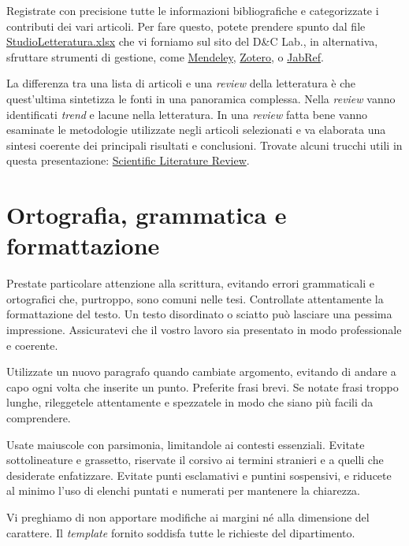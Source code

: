 \documentclass{article}
\newcounter{nota}
\begin{document}
Registrate con precisione tutte le informazioni bibliografiche e categorizzate i contributi dei vari articoli. Per fare questo, potete prendere spunto dal file \href{http://dclab.poliba.it/wp-content/uploads/StudioLetteratura.xlsx}{StudioLetteratura.xlsx} che vi forniamo sul sito del D\&C Lab., in alternativa, sfruttare strumenti di gestione, come \href{https://www.mendeley.com/?interaction_required=true}{Mendeley}, \href{https://www.zotero.org/}{Zotero}, o \href{https://www.jabref.org/}{JabRef}.

La differenza tra una lista di articoli e una \textit{review} della letteratura è che quest’ultima sintetizza le fonti in una panoramica complessa. Nella \textit{review} vanno identificati \textit{trend} e lacune nella letteratura. In una \textit{review} fatta bene  vanno esaminate le metodologie utilizzate negli articoli selezionati e va elaborata una sintesi coerente dei principali risultati e conclusioni. Trovate alcuni trucchi utili in questa presentazione:
\href{https://www.dcu.ie/sites/default/files/students_learning/scientific_lit_review_workshop_ug.pdf}{Scientific Literature Review}.

\section{Ortografia, grammatica e formattazione}
Prestate particolare attenzione alla scrittura, evitando errori grammaticali e ortografici che, purtroppo, sono comuni nelle tesi. Controllate attentamente la formattazione del testo. Un testo disordinato o sciatto può lasciare una pessima impressione. Assicuratevi che il vostro lavoro sia presentato in modo professionale e coerente.

Utilizzate un nuovo paragrafo quando cambiate argomento, evitando di andare a capo ogni volta che inserite un punto. Preferite frasi brevi. Se notate frasi troppo lunghe, rileggetele attentamente e spezzatele in modo che siano più facili da comprendere.

Usate maiuscole con parsimonia, limitandole ai contesti essenziali. Evitate sottolineature e grassetto, riservate il corsivo ai termini stranieri e a quelli che desiderate enfatizzare. Evitate punti esclamativi e puntini sospensivi, e riducete al minimo l’uso di elenchi puntati e numerati per mantenere la chiarezza.

Vi preghiamo di non apportare modifiche ai margini né alla dimensione del carattere. Il \textit{template} fornito soddisfa tutte le richieste del dipartimento.
\end{document}
